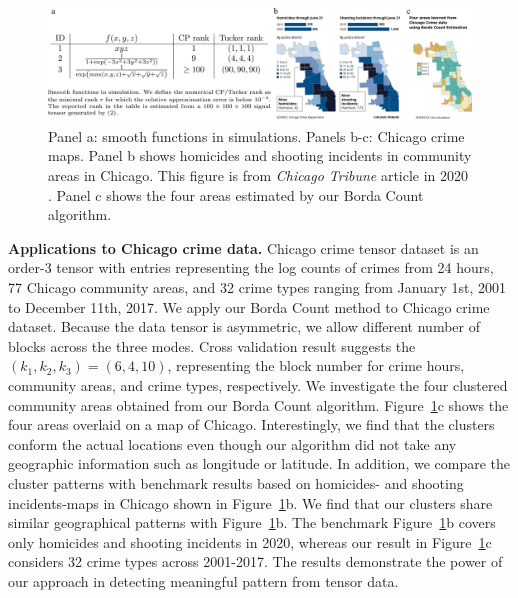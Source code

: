 \documentclass{article}
\theoremstyle{definition}
\begin{document}
\begin{figure}[h]
    \centering
    \includegraphics[width =.87 \textwidth]{figures/drawing.pdf}
    \caption{Panel a: smooth functions in simulations. Panels b-c: Chicago crime maps. Panel b shows homicides and shooting incidents in community areas in Chicago. This figure is from \textit{Chicago Tribune} article in 2020 \citep{Jeremy.2020}. Panel c shows the four areas estimated by our Borda Count algorithm. }
    \label{fig:area}
    \vspace{-.6cm}
\end{figure}

{\bf Applications to Chicago crime data.} Chicago crime tensor dataset is an order-3 tensor with entries representing the log counts of crimes from 24 hours, 77 Chicago community areas, and 32 crime types ranging from January 1st, 2001 to December 11th, 2017. We apply our Borda Count method to Chicago crime dataset.  Because the data tensor is asymmetric, we allow different number of blocks across the three modes. Cross validation result suggests the $(k_1,k_2,k_3)=(6,4,10)$, representing the block number for crime hours, community areas, and crime types, respectively.
We investigate the four clustered community areas obtained from our Borda Count algorithm.  Figure~\ref{fig:area}c shows the four areas overlaid on a map of Chicago. Interestingly,  we find that the clusters conform the actual locations even though our algorithm did not take any geographic information such as longitude or latitude. In addition, we compare the cluster patterns with benchmark results based on homicides- and shooting incidents-maps in Chicago shown in Figure~\ref{fig:area}b. We find that our clusters share similar geographical patterns with Figure~\ref{fig:area}b. The benchmark Figure~\ref{fig:area}b covers only homicides and shooting incidents in 2020, whereas our result in Figure~\ref{fig:area}c considers 32 crime types across 2001-2017. The results demonstrate the power of our approach in detecting meaningful pattern from tensor data. 

\end{document}

